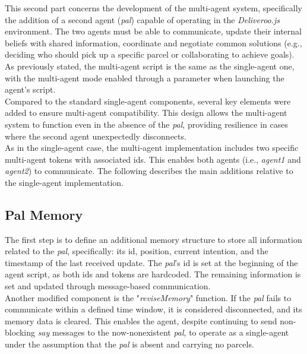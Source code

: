    This second part concerns the development of the multi-agent system, specifically the addition of a second agent (\textit{pal}) capable of operating in the \textit{Deliveroo.js} environment. The two agents must be able to communicate, update their internal beliefs with shared information, coordinate and negotiate common solutions (e.g., deciding who should pick up a specific parcel or collaborating to achieve goals).
    \medskip\\ 
    As previously stated, the multi-agent script is the same as the single-agent one, with the multi-agent mode enabled through a parameter when launching the agent's script.
    \medskip\\
    Compared to the standard single-agent components, several key elements were added to ensure multi-agent compatibility. This design allows the multi-agent system to function even in the absence of the \textit{pal}, providing resilience in cases where the second agent unexpectedly disconnects.
    \medskip\\
    As in the single-agent case, the multi-agent implementation includes two specific multi-agent tokens with associated ids. This enables both agents (i.e., \textit{agent1} and \textit{agent2}) to communicate. The following describes the main additions relative to the single-agent implementation.

    \subsection{Pal Memory}
        The first step is to define an additional memory structure to store all information related to the \textit{pal}, specifically: its id, position, current intention, and the timestamp of the last received update. The \textit{pal}'s id is set at the beginning of the agent script, as both ids and tokens are hardcoded. The remaining information is set and updated through message-based communication.
        \medskip\\
        Another modified component is the "\textit{reviseMemory}" function. If the \textit{pal} fails to communicate within a defined time window, it is considered disconnected, and its memory data is cleared. This enables the agent, despite continuing to send non-blocking \textit{say} messages to the now-nonexistent \textit{pal}, to operate as a single-agent under the assumption that the \textit{pal} is absent and carrying no parcels.

